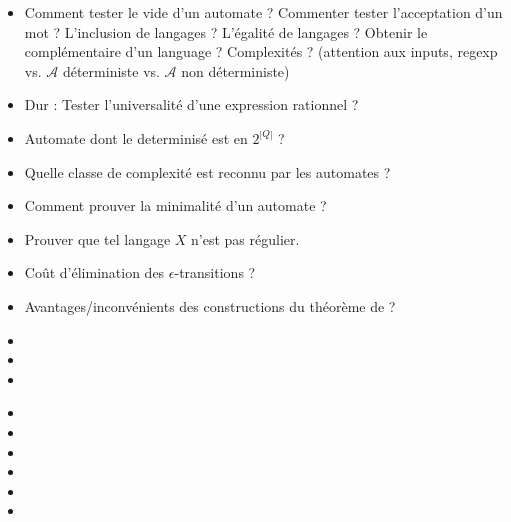 \documentclass{agregfiche}
\begin{document}
\secquestionsclassiques
\begin{itemize}
\item Comment tester le vide d'un automate ? Commenter tester
l'acceptation d'un mot ? L'inclusion de langages ? L'égalité de
langages ? Obtenir le complémentaire d'un language ? Complexités ?
(attention aux inputs, regexp vs. $\mathcal{A}$ déterministe vs.
$\mathcal{A}$ non déterministe)


\item Dur : Tester l'universalité d'une expression rationnel ?
\item Automate dont le determinisé est en $2^{|Q|}$ ?
\item Quelle classe de complexité est reconnu par les automates ?
\item Comment prouver la minimalité d'un automate ?
\item Prouver que tel langage $X$ n'est pas régulier.
\item Coût d'élimination des $\epsilon$-transitions ?
\item Avantages/inconvénients des constructions du théorème de
 ?


\end{itemize}

\secreferences
\begin{itemize}
\item 
\item 
\item 
\end{itemize}

\secdev
\begin{itemize}
\item 
\item 
\item 
\item 
\item 
\item 

\end{itemize}
\end{document}
